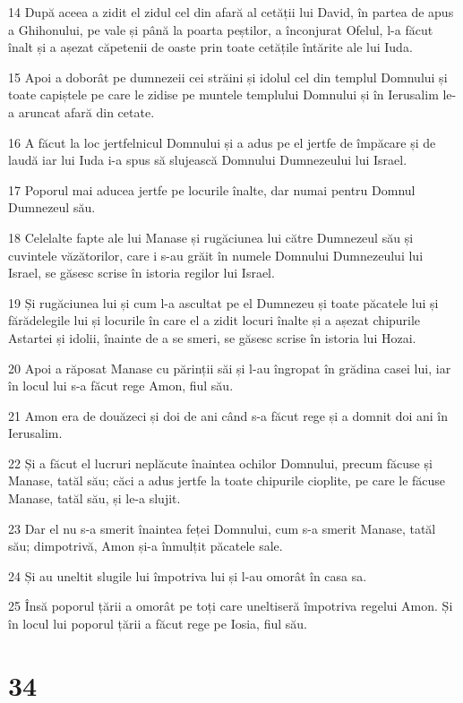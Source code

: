 \par 14 După aceea a zidit el zidul cel din afară al cetății lui David, în partea de apus a Ghihonului, pe vale și până la poarta peștilor, a înconjurat Ofelul, l-a făcut înalt și a așezat căpetenii de oaste prin toate cetățile întărite ale lui Iuda.
\par 15 Apoi a doborât pe dumnezeii cei străini și idolul cel din templul Domnului și toate capiștele pe care le zidise pe muntele templului Domnului și în Ierusalim le-a aruncat afară din cetate.
\par 16 A făcut la loc jertfelnicul Domnului și a adus pe el jertfe de împăcare și de laudă iar lui Iuda i-a spus să slujească Domnului Dumnezeului lui Israel.
\par 17 Poporul mai aducea jertfe pe locurile înalte, dar numai pentru Domnul Dumnezeul său.
\par 18 Celelalte fapte ale lui Manase și rugăciunea lui către Dumnezeul său și cuvintele văzătorilor, care i s-au grăit în numele Domnului Dumnezeului lui Israel, se găsesc scrise în istoria regilor lui Israel.
\par 19 Și rugăciunea lui și cum l-a ascultat pe el Dumnezeu și toate păcatele lui și fărădelegile lui și locurile în care el a zidit locuri înalte și a așezat chipurile Astartei și idolii, înainte de a se smeri, se găsesc scrise în istoria lui Hozai.
\par 20 Apoi a răposat Manase cu părinții săi și l-au îngropat în grădina casei lui, iar în locul lui s-a făcut rege Amon, fiul său.
\par 21 Amon era de douăzeci și doi de ani când s-a făcut rege și a domnit doi ani în Ierusalim.
\par 22 Și a făcut el lucruri neplăcute înaintea ochilor Domnului, precum făcuse și Manase, tatăl său; căci a adus jertfe la toate chipurile cioplite, pe care le făcuse Manase, tatăl său, și le-a slujit.
\par 23 Dar el nu s-a smerit înaintea feței Domnului, cum s-a smerit Manase, tatăl său; dimpotrivă, Amon și-a înmulțit păcatele sale.
\par 24 Și au uneltit slugile lui împotriva lui și l-au omorât în casa sa.
\par 25 Însă poporul țării a omorât pe toți care uneltiseră împotriva regelui Amon. Și în locul lui poporul țării a făcut rege pe Iosia, fiul său.

\chapter{34}

